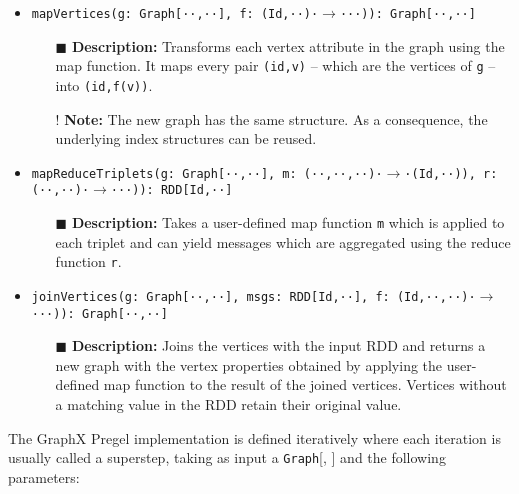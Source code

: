 \begin{itemize}
    \setlength\itemsep{1em}
    \item \texttt{mapVertices(g: Graph[·\VertSet·,·\EdgeSet·], f: (Id,·\VertSet·)·$\rightarrow$··\VertSet·)): Graph[·\VertSet·,·\EdgeSet·]}
          \begin{itemize}
              \item[$\blacksquare$] \textbf{Description:} Transforms each vertex attribute in the graph using the map function. It maps every pair \texttt{(id,v)} -- which are the vertices of \texttt{g} -- into \texttt{(id,f(v))}.
              \item[!] \textbf{Note:} The new graph has the same structure. As a consequence, the underlying index structures can be reused.
          \end{itemize}
    \item \texttt{mapReduceTriplets(g: Graph[·\VertSet·,·\EdgeSet·], m: (·\VertSet·,·\EdgeSet·,·\VertSet·)·$\rightarrow$·(Id,·\MsgSet·)), r: (·\MsgSet·,·\MsgSet·)·$\rightarrow$··\MsgSet·)): RDD[Id,·\MsgSet·]}
          \begin{itemize}
              \item[$\blacksquare$] \textbf{Description:} Takes a user-defined map function \texttt{m} which is applied to each triplet and can yield messages which are aggregated using the reduce function \texttt{r}.
          \end{itemize}
    \item \texttt{joinVertices(g: Graph[·\VertSet·,·\EdgeSet·], msgs: RDD[Id,·\MsgSet·], f: (Id,·\VertSet·,·\MsgSet·)·$\rightarrow$··\VertSet·)): Graph[·\VertSet·,·\EdgeSet·]}
          \begin{itemize}
              \item[$\blacksquare$] \textbf{Description:} Joins the vertices with the input RDD and returns a new graph with the vertex properties obtained by applying the user-defined map function to the result of the joined vertices. Vertices without a matching value in the RDD retain their original value.
          \end{itemize}
\end{itemize}

The GraphX Pregel implementation is defined iteratively where each iteration is usually called a superstep, taking as input a \texttt{Graph}[\VertSet, \EdgeSet] and the following parameters:

